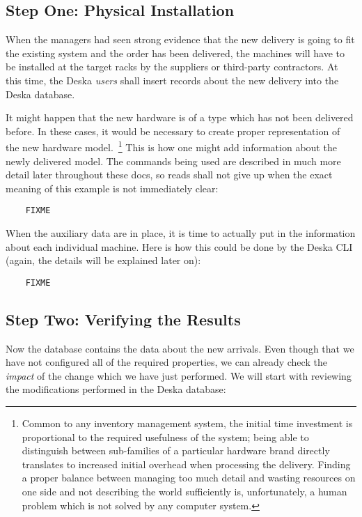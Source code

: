 \documentclass[deska]{subfiles}
\begin{document}
\subsection{Step One: Physical Installation}

When the managers had seen strong evidence that the new delivery is going to fit the existing system and the order has
been delivered, the machines will have to be installed at the target racks by the suppliers or third-party contractors.
At this time, the Deska {\em users} shall insert records about the new delivery into the Deska database.

It might happen that the new hardware is of a type which has not been delivered before.  In these cases, it would be
necessary to create proper representation of the new hardware model.~\footnote{Common to any inventory management
system, the initial time investment is proportional to the required usefulness of the system; being able to distinguish
between sub-families of a particular hardware brand directly translates to increased initial overhead when processing
the delivery.  Finding a proper balance between managing too much detail and wasting resources on one side and not
describing the world sufficiently is, unfortunately, a human problem which is not solved by any computer system.}  This
is how one might add information about the newly delivered model.  The commands being used are described in much more
detail later throughout these docs, so reads shall not give up when the exact meaning of this example is not immediately
clear:

\begin{verbatim}
    FIXME
\end{verbatim}

When the auxiliary data are in place, it is time to actually put in the information about each individual machine.  Here
is how this could be done by the Deska CLI (again, the details will be explained later on):

\begin{verbatim}
    FIXME
\end{verbatim}

\subsection{Step Two: Verifying the Results}

Now the database contains the data about the new arrivals.  Even though that we have not configured all of the required
properties, we can already check the {\em impact} of the change which we have just performed.  We will start with
reviewing the modifications performed in the Deska database:
\end{document}
